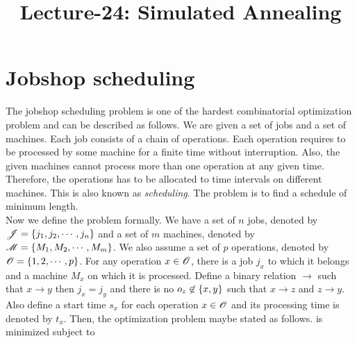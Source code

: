 \documentclass[letterpaper,english,10pt]{article}
\title{Lecture-24: Simulated Annealing}
\begin{document}
\maketitle

\section{Jobshop scheduling}
The jobshop scheduling problem is one of the hardest combinatorial optimization problem and can be described as follows.
We are given a set of jobs and a set of machines. 
Each job consists of a chain of operations. 
Each operation requires to be processed by some machine for a finite time without interruption. 
Also, the given machines cannot process more than one operation at any given time.
Therefore, the operations has to be allocated to time intervals on different machines. This is also known as \emph{scheduling}.
The problem is to find a schedule of minimum length.\\

Now we define the problem formally.
We have a set of $n$ jobs, denoted by $\mathscr{J} = \left\{j_1,j_2,\cdots,j_n\right\}$ and a set of $m$ machines, denoted by $\mathscr{M} = \left\{M_1,M_2,\cdots,M_m\right\}$.
We also assume a set of $p$ operations, denoted by $\mathscr{O} = \left\{1,2,\cdots,p\right\}$.
For any operation $x \in \mathscr{O}$, there is a job $j_x$ to which it belongs and a machine $M_x$ on which it is processed. 
Define a binary relation $\rightarrow$ such that $x \rightarrow y$ then $j_x = j_y$ and there is no $o_z \not\in \left\{x,y\right\}$ such that $x \rightarrow z$ and $z \rightarrow y$.
Also define a start time $s_x$ for each operation $x \in \mathscr{O}$ and its processing time is denoted by $t_x$.
Then, the optimization problem maybe stated as follows.
is minimized subject to 
\end{document}
